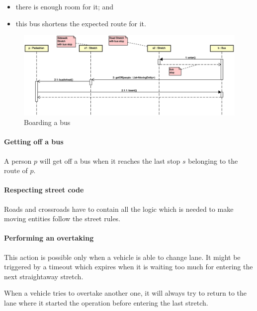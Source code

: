 \begin{itemize}
  \item there is enough room for it; and
  \item this bus shortens the expected route for it.
\end{itemize}

\begin{figure}[H]
  \centering
  \includegraphics[width=\columnwidth,trim=1 0 0 0,clip]
    {sections/images/solution/bus-boarding.eps}
  \caption{Boarding a bus}
  \label{fig:app-inter-board-bus}
\end{figure}

\paragraph{Getting off a bus} A person $p$ will get off a bus when it reaches
the last stop $s$ belonging to the route of $p$.

\paragraph{Respecting street code} Roads and crossroads have to contain 
all the logic which is needed to make moving entities follow the street rules.

\paragraph{Performing an overtaking} This action is possible only when a
vehicle is able to change lane. It might be triggered by a timeout which
expires when it is waiting too much for entering the next straightaway stretch.

When a vehicle tries to overtake another one, it will always try to return to
the lane where it started the operation before entering the last stretch.


